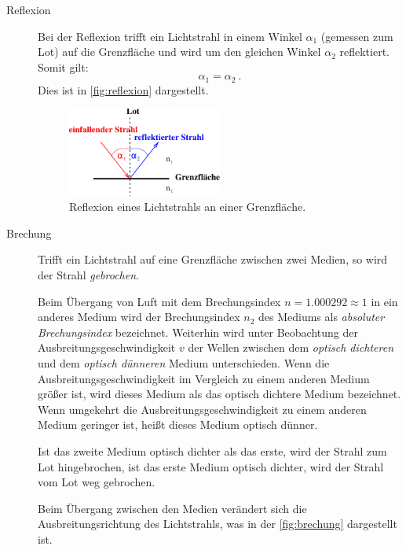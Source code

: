 \begin{description}
    \item[Reflexion]
    Bei der Reflexion trifft ein Lichtstrahl in einem Winkel $\alpha_1$ (gemessen zum Lot) auf die Grenzfläche
    und wird um den gleichen Winkel $\alpha_2$ reflektiert.
    Somit gilt:
    \begin{equation}
      \alpha_1 = \alpha_2 \ .
      \label{eqn:reflexionsgesetz}
    \end{equation}
    Dies ist in \autoref{fig:reflexion} dargestellt.

    \begin{figure}[H]
        \centering
        \includegraphics[width=0.5\textwidth]{content/img/Abb_2a.pdf}
        \caption{Reflexion eines Lichtstrahls an einer Grenzfläche. \cite{versuchsanleitung}}
        \label{fig:reflexion}
    \end{figure}


    \item[Brechung]
    Trifft ein Lichtstrahl auf eine Grenzfläche zwischen zwei Medien,
    so wird der Strahl \textit{gebrochen}.

    Beim Übergang von Luft mit dem Brechungsindex $n = \num{1.000292} \approx \num{1}$ in ein anderes Medium wird der Brechungsindex $n_2$ des Mediums als \textit{absoluter Brechungsindex} bezeichnet.
    Weiterhin wird unter Beobachtung der Ausbreitungsgeschwindigkeit $v$ der Wellen
    zwischen dem \textit{optisch dichteren} und dem \textit{optisch dünneren} Medium unterschieden.
    Wenn die Ausbreitungsgeschwindigkeit im Vergleich zu einem anderen Medium größer ist,
    wird dieses Medium als das optisch dichtere Medium bezeichnet.
    Wenn umgekehrt die Ausbreitungsgeschwindigkeit zu einem anderen Medium geringer ist,
    heißt dieses Medium optisch dünner.

    Ist das zweite Medium optisch dichter als das erste,
    wird der Strahl zum Lot hingebrochen,
    ist das erste Medium optisch dichter,
    wird der Strahl vom Lot weg gebrochen.

    Beim Übergang zwischen den Medien verändert sich die Ausbreitungsrichtung des Lichtstrahls,
    was in der \autoref{fig:brechung} dargestellt ist.


\end{description}
